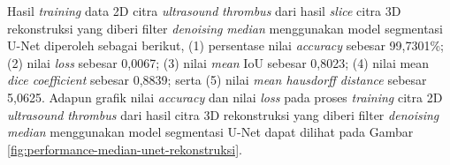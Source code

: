 \begin{enumerate}
	Hasil \textit{training} data 2D citra \textit{ultrasound} \textit{thrombus} dari hasil \textit{slice} citra 3D rekonstruksi yang diberi filter \textit{denoising} \textit{median} menggunakan model segmentasi U-Net diperoleh sebagai berikut, (1) persentase nilai \textit{accuracy} sebesar 99,7301\%; (2) nilai \textit{loss} sebesar 0,0067; (3) nilai \textit{mean} IoU sebesar 0,8023; (4) nilai mean \textit{dice coefficient} sebesar 0,8839; serta (5) nilai \textit{mean hausdorff distance} sebesar 5,0625. Adapun grafik nilai \textit{accuracy} dan nilai \textit{loss} pada proses \textit{training} citra 2D \textit{ultrasound} \textit{thrombus} dari hasil citra 3D rekonstruksi yang diberi filter \textit{denoising} \textit{median} menggunakan model segmentasi U-Net dapat dilihat pada Gambar \ref{fig:performance-median-unet-rekonstruksi}.
	

\end{enumerate}
